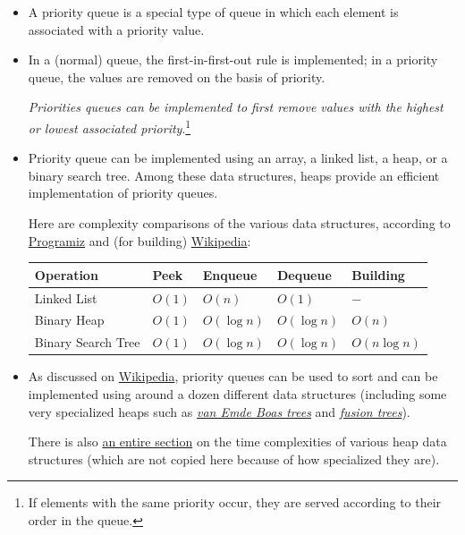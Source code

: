 \documentclass[12pt]{article}
\begin{document}
	\begin{itemize}
		\item A priority queue is a special type of queue in which each element is associated with a priority value. 
		
		\item In a (normal) queue, the first-in-first-out rule is implemented; in a priority queue, the values are removed on the basis of priority. 
		
		\emph{Priorities queues can be implemented to first remove values with the highest or lowest associated priority}.\footnote{If elements with the same priority occur, they are served according to their order in the queue.}
		
		\item Priority queue can be implemented using an array, a linked list, a heap, or a binary search tree. Among these data structures, heaps provide an efficient implementation of priority queues.
		
		Here are complexity comparisons of the various data structures, according to \href{https://www.programiz.com/dsa/priority-queue}{Programiz} and (for building) \href{https://en.wikipedia.org/wiki/Priority_queue}{Wikipedia}:
		
		\begin{center}
			\renewcommand{\arraystretch}{1.5}
			\begin{tabular}{|l|>{\centering\arraybackslash}m{22mm}|>{\centering\arraybackslash}m{22mm}|>{\centering\arraybackslash}m{22mm}|>{\centering\arraybackslash}m{22mm}|}
				\hline
				\textbf{Operation} & \textbf{Peek} & \textbf{Enqueue} & \textbf{Dequeue} & \textbf{Building} \\
				\hline
				Linked List & $O(1)$ & $O(n)$ & $O(1)$ & $-$\\
				\hline
				Binary Heap & $O(1)$ & $O(\log n)$ & $O(\log n)$ & $O(n)$ \\
				\hline
				Binary Search Tree & $O(1)$ & $O(\log n)$ & $O(\log n)$ & $O(n\log n)$\\
				\hline
			\end{tabular}
		\end{center}
	
		\item As discussed on \href{https://en.wikipedia.org/wiki/Priority_queue}{Wikipedia}, priority queues can be used to sort and can be implemented using around a dozen different data structures (including some very specialized heaps such as \href{https://en.wikipedia.org/wiki/Van_Emde_Boas_tree}{\emph{van Emde Boas trees}} and \href{https://en.wikipedia.org/wiki/Fusion_tree}{\emph{fusion trees}}).
		
		There is also \href{https://en.wikipedia.org/wiki/Priority_queue#Summary_of_running_times}{an entire section} on the time complexities of various heap data structures (which are not copied here because of how specialized they are).
	\end{itemize}
	
\end{document}
